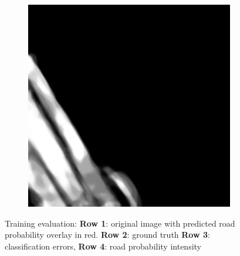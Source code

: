 \documentclass[10pt,conference,compsocconf]{IEEEtran}
\begin{document}
\begin{figure}
\begin{subfigure}[b]{0.3\columnwidth}
    \end{subfigure}
     \begin{subfigure}[b]{0.3\columnwidth}
      \includegraphics[width=\columnwidth]{figures/training_hard/eval_probability_pred_004.png}
    \end{subfigure}
    \caption{Training evaluation: \textbf{Row 1}: original image with predicted road probability overlay in red. \textbf{Row 2}: ground truth \textbf{Row 3}: classification errors, \textbf{Row 4}: road probability intensity}\label{fig:train_eval}
\end{figure}
\end{document}
